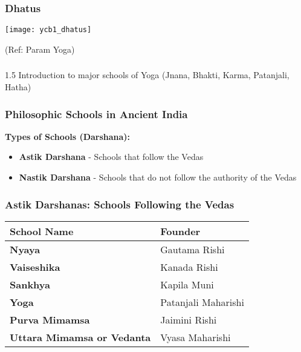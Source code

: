 \begin{frame}[fragile]\frametitle{Dhatus}
        \begin{center}
        \texttt{[image: ycb1\_dhatus]}
				
		{\tiny (Ref: Param Yoga)}	 
        \end{center}	

\end{frame}


\begin{frame}[fragile]\frametitle{}
\begin{center}
{\Large 1.5 Introduction to major schools of Yoga (Jnana, Bhakti, Karma, Patanjali, Hatha)}
\end{center}
\end{frame}

\begin{frame}[fragile]\frametitle{Philosophic Schools in Ancient India}
    \textbf{Types of Schools (Darshana):}
    \begin{itemize}
        \item \textbf{Astik Darshana} - Schools that follow the Vedas
        \item \textbf{Nastik Darshana} - Schools that do not follow the authority of the Vedas
    \end{itemize}
\end{frame}

\begin{frame}[fragile]\frametitle{Astik Darshanas: Schools Following the Vedas}
    \begin{tabular}{|l|l|}
    \hline
    \textbf{School Name} & \textbf{Founder} \\
    \hline
    \textbf{Nyaya} & Gautama Rishi \\
    \hline
    \textbf{Vaiseshika} & Kanada Rishi \\
    \hline
    \textbf{Sankhya} & Kapila Muni \\
    \hline
    \textbf{Yoga} & Patanjali Maharishi \\
    \hline
    \textbf{Purva Mimamsa} & Jaimini Rishi \\
    \hline
    \textbf{Uttara Mimamsa or Vedanta} & Vyasa Maharishi \\
    \hline
    \end{tabular}
\end{frame}

